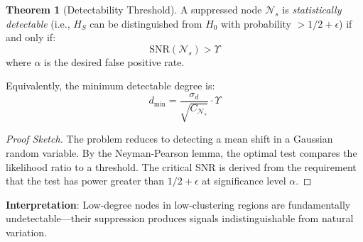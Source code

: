 \documentclass[12pt,a4paper]{article}
\theoremstyle{definition}
\newtheorem{theorem}{Theorem}[section]
\theoremstyle{remark}
\newcommand{\NS}{\mathcal{N}_s}          %
\newcommand{\Yharim}{\Upsilon}           %
\begin{document}
\begin{theorem}[Detectability Threshold]
\label{thm:detectability}
A suppressed node $\NS$ is \emph{statistically detectable} (i.e., $H_S$ can be distinguished from $H_0$ with probability $> 1/2 + \epsilon$) if and only if:
\begin{equation}
    \boxed{
    \text{SNR}(\NS) > \Yharim
    }
\end{equation}
where $\alpha$ is the desired false positive rate.

Equivalently, the minimum detectable degree is:
\begin{equation}
    d_{\min} = \frac{\sigma_d}{\sqrt{C_{\NS}}} \cdot \Yharim
\end{equation}
\end{theorem}

\begin{proof}[Proof Sketch]
The problem reduces to detecting a mean shift in a Gaussian random variable. By the Neyman-Pearson lemma, the optimal test compares the likelihood ratio to a threshold. The critical SNR is derived from the requirement that the test has power greater than $1/2 + \epsilon$ at significance level $\alpha$.
\end{proof}

\textbf{Interpretation}: Low-degree nodes in low-clustering regions are fundamentally undetectable—their suppression produces signals indistinguishable from natural variation.
\end{document}
